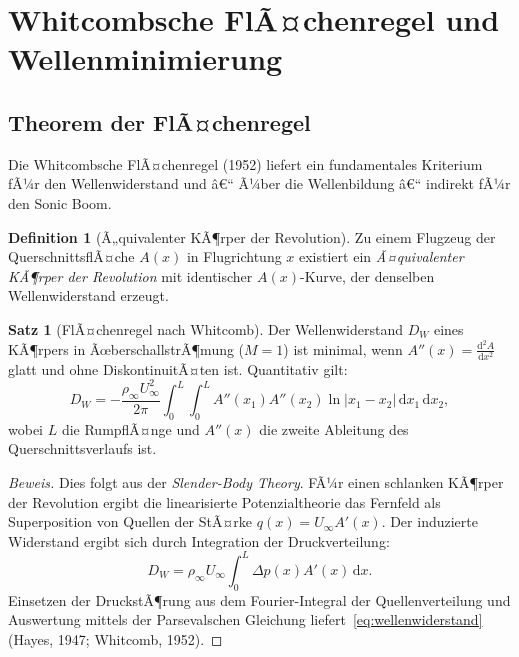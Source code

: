 ﻿\documentclass[12pt,a4paper]{article}
\theoremstyle{definition}
\newtheorem{definition}{Definition}[section]
\newtheorem{satz}{Satz}[section]
\theoremstyle{remark}
\newenvironment{beweis}{\begin{proof}[Beweis]}{\end{proof}}
\newcommand{\dd}{\,\mathrm{d}}
\begin{document}
\section{Whitcombsche FlÃ¤chenregel und Wellenminimierung}
\label{sec:flaechenregel}

\subsection{Theorem der FlÃ¤chenregel}

Die Whitcombsche FlÃ¤chenregel (1952) liefert ein fundamentales Kriterium fÃ¼r den
Wellenwiderstand und â€“ Ã¼ber die Wellenbildung â€“ indirekt fÃ¼r den Sonic Boom.

\begin{definition}[Ã„quivalenter KÃ¶rper der Revolution]
  Zu einem Flugzeug der QuerschnittsflÃ¤che $A(x)$ in Flugrichtung $x$ existiert ein
  \emph{Ã¤quivalenter KÃ¶rper der Revolution} mit identischer $A(x)$-Kurve, der denselben
  Wellenwiderstand erzeugt.
\end{definition}

\begin{satz}[FlÃ¤chenregel nach Whitcomb]
  \label{satz:flaechenregel}
  Der Wellenwiderstand $D_W$ eines KÃ¶rpers in ÃœberschallstrÃ¶mung ($M = 1$) ist minimal,
  wenn $A''(x) = \tfrac{\mathrm{d}^2 A}{\mathrm{d}x^2}$ glatt und ohne DiskontinuitÃ¤ten ist.
  Quantitativ gilt:
  \begin{equation}
    D_W = -\frac{\rho_\infty U_\infty^2}{2\pi} \int_0^L \int_0^L A''(x_1) A''(x_2)
             \ln|x_1 - x_2| \dd x_1 \dd x_2,
    \label{eq:wellenwiderstand}
  \end{equation}
  wobei $L$ die RumpflÃ¤nge und $A''(x)$ die zweite Ableitung des Querschnittsverlaufs ist.
\end{satz}

\begin{beweis}
  Dies folgt aus der \emph{Slender-Body Theory}. FÃ¼r einen schlanken KÃ¶rper der Revolution
  ergibt die linearisierte Potenzialtheorie das Fernfeld als Superposition von Quellen der
  StÃ¤rke $q(x) = U_\infty A'(x)$. Der induzierte Widerstand ergibt sich durch Integration
  der Druckverteilung:
  \begin{equation}
    D_W = \rho_\infty U_\infty \int_0^L \Delta p(x) A'(x) \dd x.
  \end{equation}
  Einsetzen der DruckstÃ¶rung aus dem Fourier-Integral der Quellenverteilung und Auswertung
  mittels der Parsevalschen Gleichung liefert~\eqref{eq:wellenwiderstand} (Hayes, 1947;
  Whitcomb, 1952). \qedhere
\end{beweis}
\end{document}
